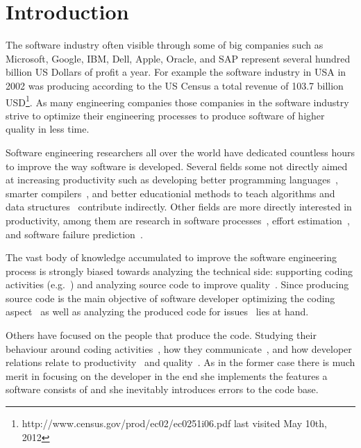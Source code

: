 \section{Introduction}
The software industry often visible through some of big companies such as Microsoft, Google, IBM, Dell, Apple, Oracle, and SAP represent several hundred billion US Dollars of profit a year. 
For example the software industry in USA in 2002 was producing according to the US Census a total revenue of 103.7 billion USD\footnote{http://www.census.gov/prod/ec02/ec0251i06.pdf last visited May 10th, 2012}.
As many engineering companies those companies in the software industry strive to optimize their engineering processes to produce software of higher quality in less time.

Software engineering researchers all over the world have dedicated countless hours to improve the way software is developed.
Several fields some not directly aimed at increasing productivity such as developing better programming languages~\cite{conf:prog:lang}, smarter compilers~\cite{cong:comp:constr}, and better educationial methods to teach algorithms and data structures~\cite{conf:sigcse} contribute indirectly.
Other fields are more directly interested in productivity, among them are research in software processes~\cite{conf:icssp}, effort estimation~\cite{molkken:isese:2003,boehm:analse:2000}, and software failure prediction~\cite{conf:promise}.

The vast body of knowledge accumulated to improve the software engineering process is strongly biased towards analyzing the technical side: supporting coding activities (e.g.~\cite{bassil:iwpc:2001,mens:tse:2004}) and analyzing source code to improve quality~\cite{zimmermann:oopsla:2005,nagappan:icse:2006}. 
Since producing source code is the main objective of software developer optimizing the coding aspect~\cite{bassil:iwpc:2001,mens:tse:2004} as well as analyzing the produced code for issues~\cite{nagappan:icse:2005,schroeter:isese:2006} lies at hand.

Others have focused on the people that produce the code. Studying their behaviour around coding activities~\cite{latoza:icse:2006}, how they communicate~\cite{ko:icse:2007,gopal:2002:comacm}, and how developer relations relate to productivity~\cite{gopal:2002:comacm} and quality~\cite{abreu:iwpse:2009,wolf:icse:2009}.
As in the former case there is much merit in focusing on the developer in the end she implements the features a software consists of and she inevitably introduces errors to the code base.

